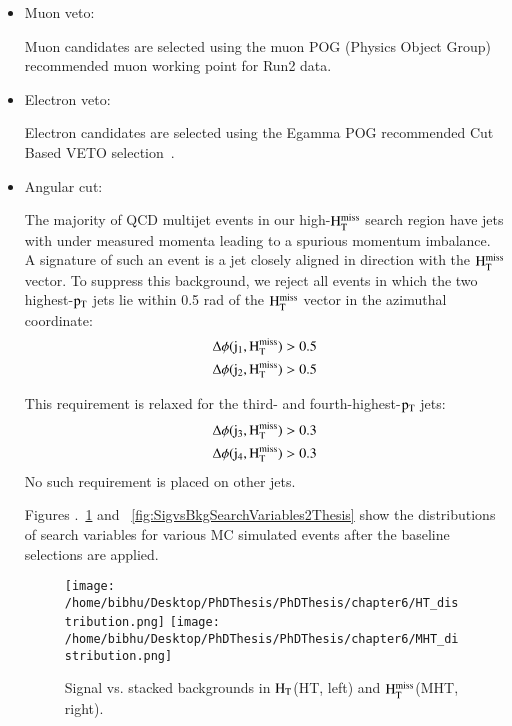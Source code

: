 \begin{itemize}
\item Muon veto:

  Muon candidates are selected using the muon POG (Physics Object Group)  ~\cite{MuonPOG} recommended 
   muon working point for Run2 data.


\item Electron veto:

  Electron candidates are selected using the Egamma POG recommended 
  Cut Based VETO selection~\cite{ElectronPOG}.



\item Angular cut:

  The majority of QCD multijet events in our high-$\rm H_{T}^{miss}$ search region
  have jets with under measured momenta leading to a spurious
  momentum imbalance.  A signature of such an event is a jet closely
  aligned in direction with the $\rm H_{T}^{miss}$ vector.  To suppress this background, we reject
  all events in which the two highest-$\rm p_{T}$ jets lie within 0.5 rad
  of the $\rm H_{T}^{miss}$ vector in the azimuthal coordinate:
\begin{align} 
\rm \Delta\phi(j_{1}, H_{T}^{miss}) & >  0.5\\
\rm \Delta\phi(j_{2}, H_{T}^{miss}) & >  0.5
\end{align} 

This requirement is relaxed for the third- and fourth-highest-$\rm p_{T}$
  jets:
\begin{align} 
\rm \Delta\phi(j_{3}, H_{T}^{miss}) & >  0.3\\
\rm \Delta\phi(j_{4}, H_{T}^{miss}) & >  0.3
 \end{align} 
No such requirement is placed on other jets.


Figures .~\ref{fig:SigvsBkgSearchVariables1Thesis} and ~\ref{fig:SigvsBkgSearchVariables2Thesis} show the  distributions of search variables for various MC simulated events after the baseline selections are applied.

\begin{figure}[h]
\begin{center}
\texttt{[image: /home/bibhu/Desktop/PhDThesis/PhDThesis/chapter6/HT\_distribution.png]}
\texttt{[image: /home/bibhu/Desktop/PhDThesis/PhDThesis/chapter6/MHT\_distribution.png]}
\caption{\label{fig:SigvsBkgSearchVariables1Thesis} Signal vs. stacked backgrounds in $\rm H_{T}$(HT, left) and $\rm H_{T}^{miss}$(MHT, right).}
\end{center}
\end{figure}


\end{itemize}
